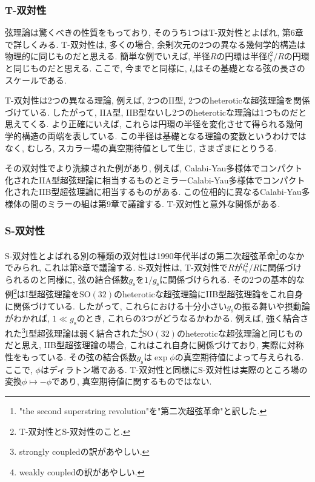 \documentclass[10pt,a4paper]{jsarticle}
\begin{document}
\subsubsection*{T-双対性}
弦理論は驚くべきの性質をもっており, そのうち1つはT-双対性とよばれ, 第6章で詳しくみる. T-双対性は, 多くの場合, 余剰次元の2つの異なる幾何学的構造は物理的に同じものだと思える. 簡単な例でいえば, 半径$R$の円環は半径$l_{\mathrm{s}}^2 / R$の円環と同じものだと思える. ここで, 今までと同様に, $l_{\mathrm{s}}$はその基礎となる弦の長さのスケールである. \par
T-双対性は2つの異なる理論, 例えば, 2つのII型, 2つのheteroticな超弦理論を関係づけている. したがって, IIA型, IIB型ないし2つのheteroticな理論は1つものだと思えてくる. より正確にいえば, これらは円環の半径を変化させて得られる幾何学的構造の両端を表している. この半径は基礎となる理論の変数というわけではなく, むしろ, スカラー場の真空期待値として生じ, さまざまにとりうる. \par
その双対性でより洗練された例があり, 例えば, Calabi-Yau多様体でコンパクト化されたIIA型超弦理論に相当するものとミラーCalabi-Yau多様体でコンパクト化されたIIB型超弦理論に相当するものがある. この位相的に異なるCalabi-Yau多様体の間のミラーの組は第9章で議論する. T-双対性と意外な関係がある. 
\subsubsection*{S-双対性}
S-双対性とよばれる別の種類の双対性は1990年代半ばの第二次超弦革命\footnote{"the second superstring revolution"を"第二次超弦革命"と訳した. }のなかでみられ, これは第8章で議論する. S-双対性は, T-双対性で$R$が$l_{\mathrm{s}}^2 / R$に関係づけられるのと同様に, 弦の結合係数$g_{\mathrm{s}} $を$1 / g_{\mathrm{s}} $に関係づけられる. その2つの基本的な例\footnote{T-双対性とS-双対性のこと. }はI型超弦理論を$\mathrm{SO} \left( 32 \right) $のheteroticな超弦理論にIIB型超弦理論をこれ自身に関係づけている. したがって, これらにおける十分小さい$g_{\mathrm{s}}$の振る舞いや摂動論がわかれば, $1 \ll g_{\mathrm{s}} $のとき, これらの3つがどうなるかわかる. 例えば, 強く結合された\footnote{strongly coupledの訳があやしい. }I型超弦理論は弱く結合された\footnote{weakly coupledの訳があやしい. }$\mathrm{SO} \left( 32 \right) $のheteroticな超弦理論と同じものだと思え, IIB型超弦理論の場合, これはこれ自身に関係づけており, 実際に対称性をもっている. その弦の結合係数$g_{\mathrm{s}} $は$\exp \phi $の真空期待値によって与えられる. ここで, $\phi $はディラトン場である. T-双対性と同様にS-双対性は実際のところ場の変換$\phi \mapsto - \phi $であり, 真空期待値に関するものではない. 
\end{document}
